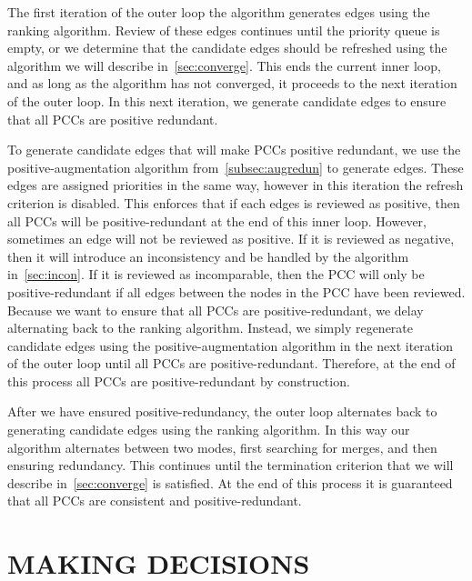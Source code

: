 The first iteration of the outer loop the algorithm generates edges using the ranking algorithm.
Review of these edges continues until the priority queue is empty, or we determine that the candidate edges
  should be refreshed using the algorithm we will describe in~\cref{sec:converge}.
This ends the current inner loop, and as long as the algorithm has not converged, it proceeds to the next
  iteration of the outer loop.
In this next iteration, we generate candidate edges to ensure that all PCCs are positive redundant.

To generate candidate edges that will make PCCs positive redundant, we use the positive-augmentation algorithm
  from~\cref{subsec:augredun} to generate edges.
These edges are assigned priorities in the same way, however in this iteration the refresh criterion is disabled.
This enforces that if each edges is reviewed as positive, then all PCCs will be positive-redundant at the end of
  this inner loop.
However, sometimes an edge will not be reviewed as positive.
If it is reviewed as negative, then it will introduce an inconsistency and be handled by the algorithm
  in~\cref{sec:incon}.
If it is reviewed as incomparable, then the PCC will only be positive-redundant if all edges between the nodes in
  the PCC have been reviewed.
Because we want to ensure that all PCCs are positive-redundant, we delay alternating back to the ranking
  algorithm.
Instead, we simply regenerate candidate edges using the positive-augmentation algorithm in the next iteration of
  the outer loop until all PCCs are positive-redundant.
Therefore, at the end of this process all PCCs are positive-redundant by construction.

After we have ensured positive-redundancy, the outer loop alternates back to generating candidate edges using the
  ranking algorithm.
In this way our algorithm alternates between two modes, first searching for merges, and then ensuring redundancy.
This continues until the termination criterion that we will describe in~\cref{sec:converge} is satisfied.
At the end of this process it is guaranteed that all PCCs are consistent and positive-redundant.


\section{MAKING DECISIONS}\label{sec:decision}

